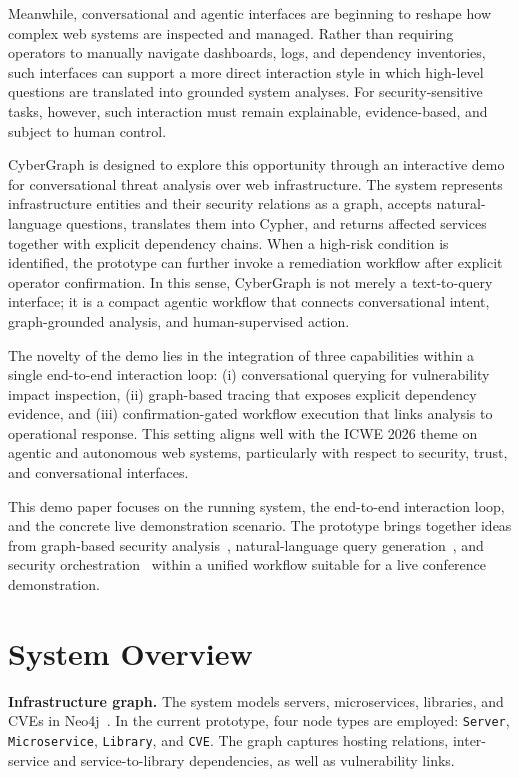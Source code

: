 \documentclass[runningheads]{llncs}
\newcommand{\sysname}{CyberGraph\xspace}
\begin{document}
Meanwhile, conversational and agentic interfaces are beginning to reshape how complex web systems are inspected and managed. Rather than requiring operators to manually navigate dashboards, logs, and dependency inventories, such interfaces can support a more direct interaction style in which high-level questions are translated into grounded system analyses. For security-sensitive tasks, however, such interaction must remain explainable, evidence-based, and subject to human control.

\sysname is designed to explore this opportunity through an interactive demo for conversational threat analysis over web infrastructure. The system represents infrastructure entities and their security relations as a graph, accepts natural-language questions, translates them into Cypher, and returns affected services together with explicit dependency chains. When a high-risk condition is identified, the prototype can further invoke a remediation workflow after explicit operator confirmation. In this sense, \sysname is not merely a text-to-query interface; it is a compact agentic workflow that connects conversational intent, graph-grounded analysis, and human-supervised action.

The novelty of the demo lies in the integration of three capabilities within a single end-to-end interaction loop: (i) conversational querying for vulnerability impact inspection, (ii) graph-based tracing that exposes explicit dependency evidence, and (iii) confirmation-gated workflow execution that links analysis to operational response. This setting aligns well with the ICWE 2026 theme on agentic and autonomous web systems, particularly with respect to security, trust, and conversational interfaces.

This demo paper focuses on the running system, the end-to-end interaction loop, and the concrete live demonstration scenario. The prototype brings together ideas from graph-based security analysis~\cite{peng2022threat,li2024graphrag}, natural-language query generation~\cite{chen2023text,gao2023texttosql}, and security orchestration~\cite{islam2023soar,milajerdi2019holmes} within a unified workflow suitable for a live conference demonstration.

\section{System Overview}


\textbf{Infrastructure graph.}
The system models servers, microservices, libraries, and CVEs in Neo4j~\cite{robinson2015graph}. In the current prototype, four node types are employed: \texttt{Server}, \texttt{Microservice}, \texttt{Library}, and \texttt{CVE}. The graph captures hosting relations, inter-service and service-to-library dependencies, as well as vulnerability links.
\end{document}
